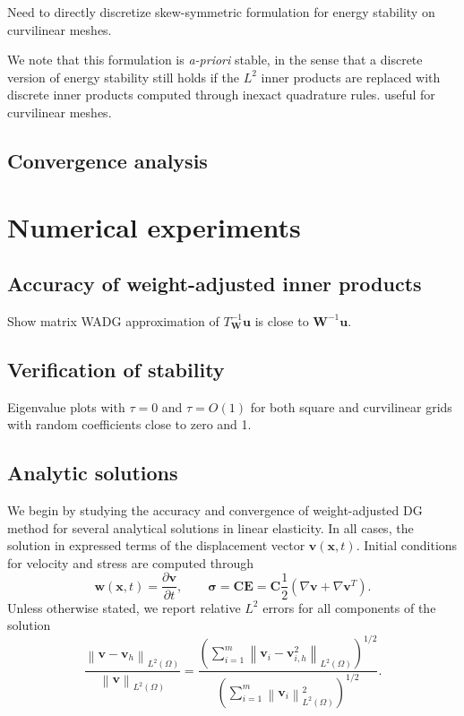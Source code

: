 \documentclass{siamart0216}
\newcommand{\pd}[2]{\frac{\partial#1}{\partial#2}}
\newcommand{\nor}[1]{\left\| #1 \right\|}
\newcommand{\LRp}[1]{\left( #1 \right)}
\newcommand{\Grad} {\ensuremath{\nabla}}
\newcommand{\note}[1]{{\color{blue}#1}}
\begin{document}
Need to directly discretize skew-symmetric formulation for energy stability on curvilinear meshes.  

We note that this formulation is \emph{a-priori} stable, in the sense that a discrete version of energy stability still holds if the $L^2$ inner products are replaced with discrete inner products computed through inexact quadrature rules.  \note{useful for curvilinear meshes}.

\subsection{Convergence analysis}



\section{Numerical experiments}

\subsection{Accuracy of weight-adjusted inner products}

Show matrix WADG approximation of $T^{-1}_{\bm{W}}\bm{u}$ is close to $\bm{W}^{-1}\bm{u}$.

\subsection{Verification of stability}

Eigenvalue plots with $\tau = 0$ and $\tau = O(1)$ for both square and curvilinear grids with random coefficients close to zero and 1.  

\subsection{Analytic solutions} 

We begin by studying the accuracy and convergence of weight-adjusted DG method for several analytical solutions in linear elasticity.  In all cases, the solution in expressed terms of the displacement vector $\bm{v}(\bm{x},t)$.  Initial conditions for velocity and stress are computed through 
\[
\bm{w}(\bm{x},t) = \pd{\bm{v}}{t}, \qquad \bm{\sigma} = \bm{C}\bm{E} = \bm{C}\frac{1}{2}\LRp{\Grad\bm{v} + \Grad\bm{v}^T}.  
\]
Unless otherwise stated, we report relative $L^2$ errors for all components of the solution 
\[
\frac{\nor{\bm{v}-\bm{v}_h}_{L^2\LRp{\Omega}}}{\nor{\bm{v}}_{L^2\LRp{\Omega}}} = \frac{\LRp{\sum_{i=1}^m \nor{\bm{v}_i-\bm{v}^2_{i,h}}_{L^2\LRp{\Omega}}}^{1/2}}{\LRp{\sum_{i=1}^m\nor{\bm{v}_i}^2_{L^2\LRp{\Omega}}}^{1/2}}.
\]
\end{document}
